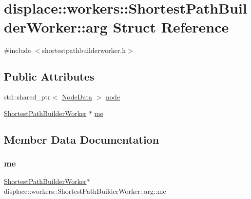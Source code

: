 \hypertarget{structdisplace_1_1workers_1_1_shortest_path_builder_worker_1_1arg}{}\section{displace\+::workers\+::Shortest\+Path\+Builder\+Worker\+::arg Struct Reference}
\label{structdisplace_1_1workers_1_1_shortest_path_builder_worker_1_1arg}


{\ttfamily \#include $<$shortestpathbuilderworker.\+h$>$}

\subsection*{Public Attributes}
\begin{DoxyCompactItemize}
\item 
std\+::shared\+\_\+ptr$<$ \mbox{\hyperlink{class_node_data}{Node\+Data}} $>$ \mbox{\hyperlink{structdisplace_1_1workers_1_1_shortest_path_builder_worker_1_1arg_a387456d9ae2ba572f98493ba5c381b8f}{node}}
\item 
\mbox{\hyperlink{classdisplace_1_1workers_1_1_shortest_path_builder_worker}{Shortest\+Path\+Builder\+Worker}} $\ast$ \mbox{\hyperlink{structdisplace_1_1workers_1_1_shortest_path_builder_worker_1_1arg_a7748e202d216df134d7d08f6f2126d42}{me}}
\end{DoxyCompactItemize}


\subsection{Member Data Documentation}
\mbox{\label{structdisplace_1_1workers_1_1_shortest_path_builder_worker_1_1arg_a7748e202d216df134d7d08f6f2126d42}} 
\subsubsection{\texorpdfstring{me}{me}}
{\footnotesize\ttfamily \mbox{\hyperlink{classdisplace_1_1workers_1_1_shortest_path_builder_worker}{Shortest\+Path\+Builder\+Worker}}$\ast$ displace\+::workers\+::\+Shortest\+Path\+Builder\+Worker\+::arg\+::me}

